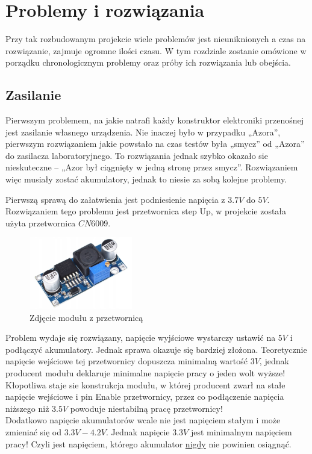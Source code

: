 \section{Problemy i rozwiązania}
    \tab Przy tak rozbudowanym projekcie wiele problemów jest nieuniknionych a czas na rozwiązanie, zajmuje ogromne ilości czasu.
    W tym rozdziale zostanie omówione w porządku chronologicznym problemy oraz próby ich rozwiązania lub obejścia.

    \subsection{Zasilanie}
        \tab Pierwszym problemem, na jakie natrafi każdy konstruktor elektroniki przenośnej jest zasilanie własnego urządzenia.
        Nie inaczej było w przypadku „Azora”, pierwszym rozwiązaniem jakie powstało na czas testów była „smycz” od „Azora” do zasilacza laboratoryjnego.
        To rozwiązania jednak szybko okazało sie nieskuteczne -- „Azor był ciągnięty w jedną stronę przez smycz”. 
        Rozwiązaniem więc musiały zostać akumulatory, jednak to niesie za sobą kolejne problemy.

        Pierwszą sprawą do załatwienia jest podniesienie napięcia z $3.7V$ do $5V$. 
        Rozwiązaniem tego problemu jest przetwornica step Up, w projekcie została użyta przetwornica $CN6009$.
        \begin{figure}[!ht]
            \centering
            \includegraphics[width = 0.4\textwidth]{Img/przetwornica.jpeg}
            \caption{Zdjęcie modułu z przetwornicą}
        \end{figure}

        \noindent
        Problem wydaje się rozwiązany, napięcie wyjściowe wystarczy ustawić na $5V$ i podłączyć akumulatory.
        Jednak sprawa okazuje się bardziej złożona. 
        Teoretycznie napięcie wejściowe tej przetwornicy dopuszcza minimalną wartość $3V$, jednak producent modułu deklaruje minimalne napięcie pracy o jeden wolt wyższe!
        Kłopotliwa staje sie konstrukcja modułu, w której producent zwarł na stałe napięcie wejściowe i pin Enable przetwornicy, przez co podłączenie napięcia niższego niż $3.5V$ powoduje niestabilną pracę przetwornicy!\\
        Dodatkowo napięcie akumulatorów wcale nie jest napięciem stałym i może zmieniać się od $3.3V - 4.2V$.
        Jednak napięcie $3.3V$ jest minimalnym napięciem pracy! Czyli jest napięciem, którego akumulator \underline{nigdy} nie powinien osiągnąć.

